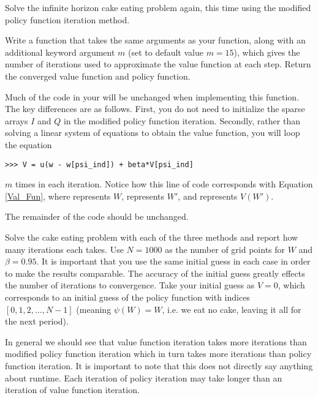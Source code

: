 \begin{problem}
Solve the infinite horizon cake eating problem again, this time using the modified policy function
iteration method.

Write a function  that takes the same arguments as your  function, along
with an additional keyword argument $m$ (set to default value $m=15$), which gives the number of iterations used
to approximate the value function at each step. Return the converged value function and policy function. 

Much of the code in your  will be unchanged when implementing this function. The key differences are
as follows.
First, you do not need to initialize the sparse arrays $I$ and $Q$ in the modified policy function iteration.
Secondly, rather than solving a linear system of equations to obtain the value function, you will loop
the equation
\begin{lstlisting}
>>> V = u(w - w[psi_ind]) + beta*V[psi_ind]
\end{lstlisting}
$m$ times in each iteration. Notice how this line of code corresponds with Equation \eqref{Val_Fun}, where
 represents $W$,  represents $W'$, and  represents $V(W')$.

The remainder of the code should be unchanged.


\end{problem}

\begin{problem}
Solve the cake eating problem with each of the three methods and report how many iterations each takes.  Use $N= 1000$ as the
number of grid points for $W$ and $\beta = 0.95$.  It is important that you use the same initial guess in each case in order to
make the results comparable.  The accuracy of the initial guess greatly effects the number of iterations to convergence.  Take
your initial guess as $V = 0$, which corresponds to an initial guess of the policy function with indices $[0,1,2,\ldots, N-1]$
(meaning $\psi(W) = W$, i.e. we eat no cake, leaving it all for the next period).
\end{problem}

In general we should see that value function iteration takes more iterations than modified policy function iteration which in turn
takes more iterations than policy function iteration.  It is important to note that this does not directly say anything about runtime.
Each iteration of policy iteration may take longer than an iteration of value function iteration.

